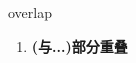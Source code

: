 
\begin{frame}
{\huge overlap}
\begin{center}
\begin{enumerate}\Large
  \item \textbf{(与...)部分重叠}
\end{enumerate}
\end{center}
\end{frame}
